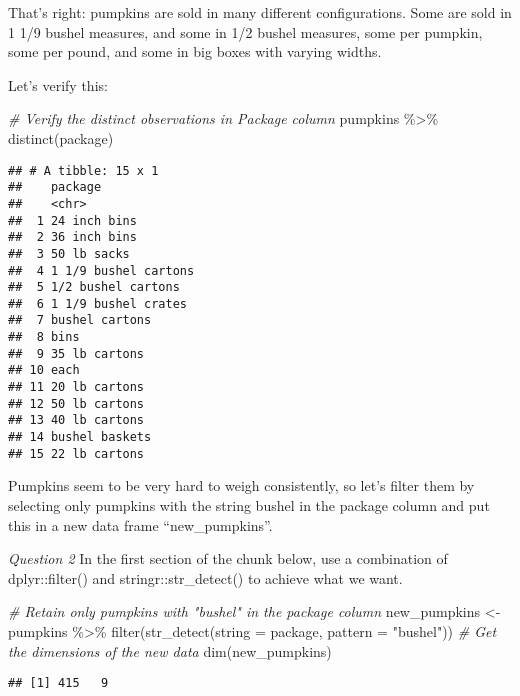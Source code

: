 \documentclass[
]{article}
\newenvironment{Shaded}{\begin{snugshade}}{\end{snugshade}}
\newcommand{\AttributeTok}[1]{\textcolor[rgb]{0.77,0.63,0.00}{#1}}
\newcommand{\CommentTok}[1]{\textcolor[rgb]{0.56,0.35,0.01}{\textit{#1}}}
\newcommand{\FunctionTok}[1]{\textcolor[rgb]{0.00,0.00,0.00}{#1}}
\newcommand{\NormalTok}[1]{#1}
\newcommand{\OtherTok}[1]{\textcolor[rgb]{0.56,0.35,0.01}{#1}}
\newcommand{\SpecialCharTok}[1]{\textcolor[rgb]{0.00,0.00,0.00}{#1}}
\newcommand{\StringTok}[1]{\textcolor[rgb]{0.31,0.60,0.02}{#1}}
\begin{document}
That's right: pumpkins are sold in many different configurations. Some
are sold in 1 1/9 bushel measures, and some in 1/2 bushel measures, some
per pumpkin, some per pound, and some in big boxes with varying widths.

Let's verify this:

\begin{Shaded}
\begin{Highlighting}[]
\CommentTok{\# Verify the distinct observations in Package column}
\NormalTok{pumpkins }\SpecialCharTok{\%\textgreater{}\%} 
  \FunctionTok{distinct}\NormalTok{(package)}
\end{Highlighting}
\end{Shaded}

\begin{verbatim}
## # A tibble: 15 x 1
##    package             
##    <chr>               
##  1 24 inch bins        
##  2 36 inch bins        
##  3 50 lb sacks         
##  4 1 1/9 bushel cartons
##  5 1/2 bushel cartons  
##  6 1 1/9 bushel crates 
##  7 bushel cartons      
##  8 bins                
##  9 35 lb cartons       
## 10 each                
## 11 20 lb cartons       
## 12 50 lb cartons       
## 13 40 lb cartons       
## 14 bushel baskets      
## 15 22 lb cartons
\end{verbatim}

Pumpkins seem to be very hard to weigh consistently, so let's filter
them by selecting only pumpkins with the string bushel in the package
column and put this in a new data frame ``new\_pumpkins''.

\emph{Question 2} In the first section of the chunk below, use a
combination of dplyr::filter() and stringr::str\_detect() to achieve
what we want.

\begin{Shaded}
\begin{Highlighting}[]
\CommentTok{\# Retain only pumpkins with "bushel" in the package column}
\NormalTok{new\_pumpkins }\OtherTok{\textless{}{-}}\NormalTok{ pumpkins }\SpecialCharTok{\%\textgreater{}\%} 
  \FunctionTok{filter}\NormalTok{(}\FunctionTok{str\_detect}\NormalTok{(}\AttributeTok{string =}\NormalTok{ package, }\AttributeTok{pattern =} \StringTok{"bushel"}\NormalTok{))}
\CommentTok{\# Get the dimensions of the new data}
\FunctionTok{dim}\NormalTok{(new\_pumpkins)}
\end{Highlighting}
\end{Shaded}

\begin{verbatim}
## [1] 415   9
\end{verbatim}
\end{document}

